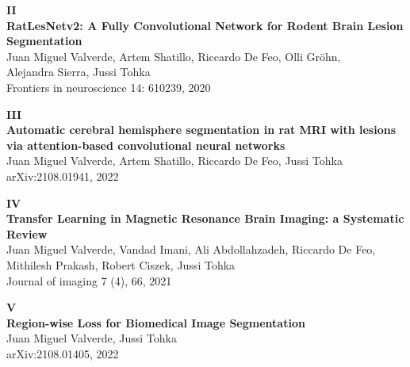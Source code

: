 \documentclass[b5paper,12pt]{memoir}  %
\begin{document}
\cleardoublepage




\cleardoublepage
\begin{vplace}[0.7]
\centering
\textbf{II} \\[1cm]

\textbf{RatLesNetv2: A Fully Convolutional Network for Rodent Brain Lesion Segmentation}\\[1cm]

Juan Miguel Valverde, Artem Shatillo, Riccardo De Feo, Olli Gröhn, \\ Alejandra Sierra, Jussi Tohka \\[1cm]

Frontiers in neuroscience 14: 610239, 2020
\end{vplace}


\cleardoublepage




\cleardoublepage
\begin{vplace}[0.7]
\centering
\textbf{III} \\[1cm]

\textbf{Automatic cerebral hemisphere segmentation in rat MRI with lesions via attention-based convolutional neural networks}\\[1cm]

Juan Miguel Valverde, Artem Shatillo, Riccardo De Feo, Jussi Tohka \\[1cm]

arXiv:2108.01941, 2022
\end{vplace}

\cleardoublepage





\cleardoublepage
\begin{vplace}[0.7]
\centering
\textbf{IV} \\[1cm]

\textbf{Transfer Learning in Magnetic Resonance Brain Imaging: a Systematic Review}\\[1cm]

Juan Miguel Valverde, Vandad Imani, Ali Abdollahzadeh, Riccardo De Feo, Mithilesh Prakash, Robert Ciszek, Jussi Tohka \\[1cm]

Journal of imaging 7 (4), 66, 2021
\end{vplace}

\cleardoublepage





\cleardoublepage
\begin{vplace}[0.7]
\centering
\textbf{V} \\[1cm]

\textbf{Region-wise Loss for Biomedical Image Segmentation}\\[1cm]

Juan Miguel Valverde, Jussi Tohka \\[1cm]

arXiv:2108.01405, 2022
\end{vplace}

\cleardoublepage



\end{document}
